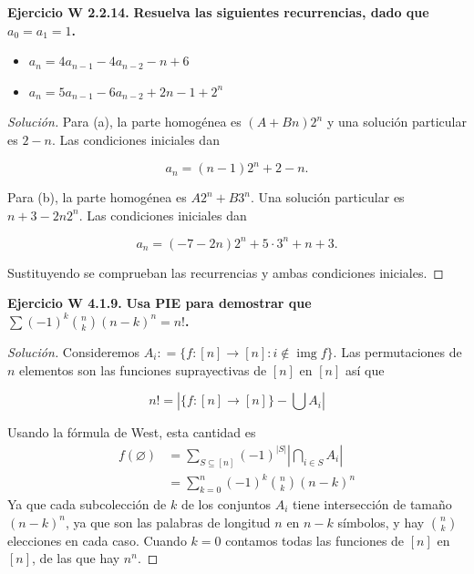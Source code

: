 \medskip\noindent\textbf{Ejercicio W 2.2.14.}
\textbf{Resuelva las siguientes recurrencias,
dado que $a_0 = a_1 = 1$.}
\begin{itemize}
\item [(a)]$a_n=4a_{n-1}-4a_{n-2}-n+6$
\item[(b)]$a_n=5a_{n-1}-6a_{n-2}+2n-1+2^n$
\end{itemize}
\begin{proof}[Solución]
Para (a), la parte homogénea es $(A + Bn)2^n$
y una solución particular es $2-n$. Las
condiciones iniciales dan

$$
a_n=(n-1)2^n+2-n.
$$

Para (b), la parte homogénea es $A2^n +
B3^n$. Una solución particular es $n +
3-2n2^n$. Las condiciones iniciales dan

$$
a_n=(-7-2n)2^n+5\cdot3^n+n+3.
$$

Sustituyendo se comprueban las recurrencias y
ambas condiciones iniciales.
\end{proof}
\medskip\noindent\textbf{Ejercicio W 4.1.9.}
\textbf{Usa PIE para demostrar que $
\sum(-1)^k{n \choose k}(n-k)^n = n!$.}
\begin{proof}[Solución]
Consideremos $A_i: = \{f:[n]\to[n]:i\notin
\operatorname{img} f\}$. Las permutaciones de
$n$ elementos son las funciones suprayectivas
de $[n]$ en $[n]$ así que

$$
n!=\left|\{f:[n]\to[n]\}-\bigcup A_i\right|
$$

Usando la fórmula de West, esta cantidad es
$$
\begin{aligned}
f(\varnothing)& =
\sum_{S\subseteq[n]}(-1)^{|S|}
\left|\bigcap_{i\in S}A_i \right|\\
&=\sum_{k=0}^n(-1)^k{n\choose k}(n-k)^n
\end{aligned}
$$
Ya que cada subcolección de $k$ de los
conjuntos $A_i$ tiene intersección de tamaño
$(n-k)^n$, ya que son las palabras de
longitud $n$ en $n-k$ símbolos, y hay ${n
\choose k}$ elecciones en cada caso. Cuando
$k = 0$ contamos todas las funciones de $[n]$
en $[n]$, de las que hay $n^n$.
\end{proof}

